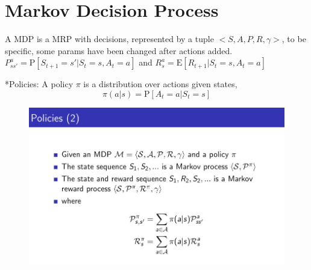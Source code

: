 \documentclass[10pt, a4paper, twocolumn]{article} %
\begin{document}
\section{Markov Decision Process}
A MDP is a MRP with decisions, represented by a tuple $<S, A, P, R ,\gamma>$, to be specific, some params have been changed after actions added.
$P_{ss'}^a = \textrm{P}[S_{t+1} = s' | S_{t} = s, A_{t} = a]$ and $R^{a}_{s} = \textrm{E}[R_{t+1} | S_{t} = s, A_{t} = a]$

*Policies: A policy $\pi$ is a distribution over actions given states, 
$$\pi(a|s) = \textrm{P}[A_{t} = a | S_{t} = s]$$

\begin{figure}
	\begin{centering}
		\includegraphics[width = \linewidth]{policy.jpg}
	\end{centering}
\end{figure}




\printbibliography[title={Bibliography}] %

\end{document}
